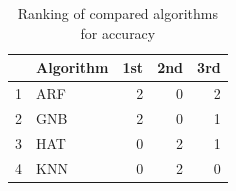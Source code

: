 \begin{table}
\footnotesize
\caption{Ranking of compared algorithms for accuracy}
\label{tab:places accuracy}
\begin{tabular}{llrrr}
\hline
 & Algorithm & 1st & 2nd & 3rd \\
\hline
1 & ARF & 2 & 0 & 2 \\
2 & GNB & 2 & 0 & 1 \\
3 & HAT & 0 & 2 & 1 \\
4 & KNN & 0 & 2 & 0 \\
\hline
\end{tabular}
\end{table}
